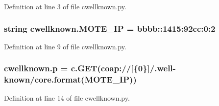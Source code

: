 Definition at line 3 of file cwellknown.\+py.

\subsubsection[{\texorpdfstring{M\+O\+T\+E\+\_\+\+IP}{MOTE_IP}}]{\setlength{\rightskip}{0pt plus 5cm}string cwellknown.\+M\+O\+T\+E\+\_\+\+IP = \textquotesingle{}bbbb\+::1415\+:92cc\+:0\+:2\textquotesingle{}}\hypertarget{namespacecwellknown_a09d0560483e11548bf674f44f901f86e}{}\label{namespacecwellknown_a09d0560483e11548bf674f44f901f86e}


Definition at line 9 of file cwellknown.\+py.

\subsubsection[{\texorpdfstring{p}{p}}]{\setlength{\rightskip}{0pt plus 5cm}cwellknown.\+p = c.\+G\+ET(\textquotesingle{}coap\+://\mbox{[}\{0\}\mbox{]}/.well-\/known/core\textquotesingle{}.format({\bf M\+O\+T\+E\+\_\+\+IP}))}\hypertarget{namespacecwellknown_ae44f08bf9d6b6a4fbc6289c2a6e9138d}{}\label{namespacecwellknown_ae44f08bf9d6b6a4fbc6289c2a6e9138d}


Definition at line 14 of file cwellknown.\+py.

